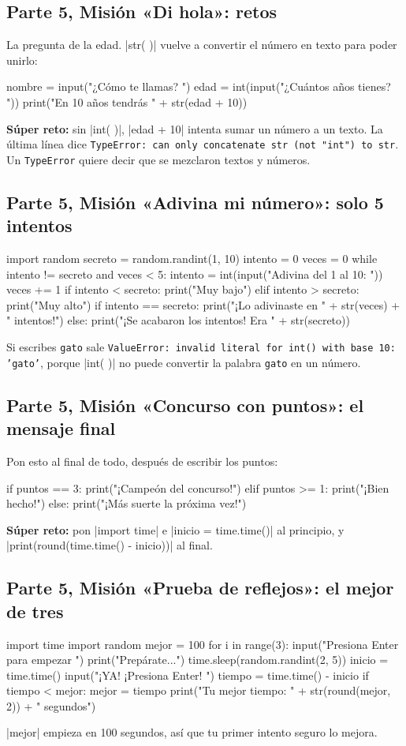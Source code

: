 \subsection*{Parte 5, Misión «Di hola»: retos}
La pregunta de la edad. \py|str( )| vuelve a convertir el número en texto para poder unirlo:
\begin{codenonum}
nombre = input("¿Cómo te llamas? ")
edad = int(input("¿Cuántos años tienes? "))
print("En 10 años tendrás " + str(edad + 10))
\end{codenonum}
\textbf{Súper reto:} sin \py|int( )|, \py|edad + 10| intenta sumar un número a un texto. La última línea dice \texttt{TypeError: can only concatenate str (not "int") to str}. Un \texttt{TypeError} quiere decir que se mezclaron textos y números.

\subsection*{Parte 5, Misión «Adivina mi número»: solo 5 intentos}
\begin{codenonum}
import random
secreto = random.randint(1, 10)
intento = 0
veces = 0
while intento != secreto and veces < 5:
    intento = int(input("Adivina del 1 al 10: "))
    veces += 1
    if intento < secreto:
        print("Muy bajo")
    elif intento > secreto:
        print("Muy alto")
if intento == secreto:
    print("¡Lo adivinaste en " + str(veces) + " intentos!")
else:
    print("¡Se acabaron los intentos! Era " + str(secreto))
\end{codenonum}
Si escribes \texttt{gato} sale \texttt{ValueError: invalid literal for int() with base 10: 'gato'}, porque \py|int( )| no puede convertir la palabra \texttt{gato} en un número.

\subsection*{Parte 5, Misión «Concurso con puntos»: el mensaje final}
Pon esto al final de todo, después de escribir los puntos:
\begin{codenonum}
if puntos == 3:
    print("¡Campeón del concurso!")
elif puntos >= 1:
    print("¡Bien hecho!")
else:
    print("¡Más suerte la próxima vez!")
\end{codenonum}
\textbf{Súper reto:} pon \py|import time| e \py|inicio = time.time()| al principio, y \py|print(round(time.time() - inicio))| al final.

\subsection*{Parte 5, Misión «Prueba de reflejos»: el mejor de tres}
\begin{codenonum}
import time
import random
mejor = 100
for i in range(3):
    input("Presiona Enter para empezar ")
    print("Prepárate...")
    time.sleep(random.randint(2, 5))
    inicio = time.time()
    input("¡YA! ¡Presiona Enter! ")
    tiempo = time.time() - inicio
    if tiempo < mejor:
        mejor = tiempo
print("Tu mejor tiempo: " + str(round(mejor, 2)) + " segundos")
\end{codenonum}
\py|mejor| empieza en 100 segundos, así que tu primer intento seguro lo mejora.


